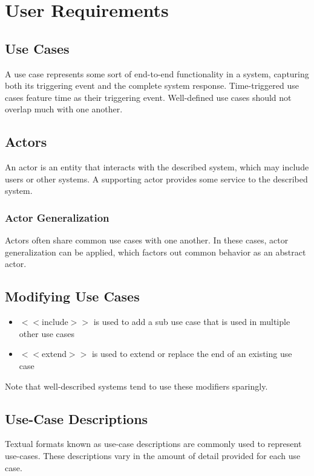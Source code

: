 \documentclass[12pt,titlepage]{article}
\let\stdsection\section
\renewcommand\section{\clearpage\stdsection}
\begin{document}
  \section{User Requirements}

    \subsection{Use Cases}
      A use case represents some sort of end-to-end functionality in a system, capturing both its triggering event and the complete system response.
      Time-triggered use cases feature time as their triggering event. Well-defined use cases should not overlap much with one another.

      \subsection{Actors}
        An actor is an entity that interacts with the described system, which may include users or other systems. A supporting actor provides some service to the
        described system.

        \subsubsection{Actor Generalization}
          Actors often share common use cases with one another. In these cases, actor generalization can be applied, which factors out common behavior as an
          abstract actor.

      \subsection{Modifying Use Cases}
        \begin{itemize}
          \item $<<$include$>>$ is used to add a sub use case that is used in multiple other use cases
          \item $<<$extend$>>$ is used to extend or replace the end of an existing use case
        \end{itemize}
        Note that well-described systems tend to use these modifiers sparingly.

      \subsection{Use-Case Descriptions}
        Textual formats known as use-case descriptions are commonly used to represent use-cases. These descriptions vary in the amount of detail provided for
        each use case.
\end{document}
